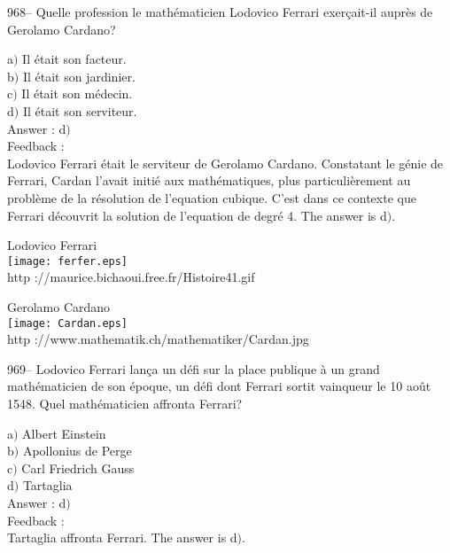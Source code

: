 ﻿\documentclass[letterpaper, 12pt]{article}
\begin{document}
968-- Quelle profession le math\'ematicien Lodovico Ferrari exer\c
cait-il aupr\`es de Gerolamo Cardano?

a$)$ Il \'etait son facteur. \\
b$)$ Il \'etait son jardinier.  \\
c$)$ Il \'etait son m\'edecin. \\
d$)$ Il \'etait son serviteur. \\

Answer : d$)$\\

Feedback : \\
Lodovico Ferrari \'etait le serviteur de Gerolamo Cardano.
Constatant le g\'enie de Ferrari, Cardan l'avait initi\'e aux
math\'emati\-ques, plus particuli\`erement au probl\`eme de la
r\'esolution de l'equation
cubique. C'est dans ce contexte que Ferrari d\'ecouvrit la solution de
l'equation de degr\'e 4. The answer is d$)$.\\

        \begin{center}
        Lodovico Ferrari\\
    \texttt{[image: ferfer.eps]}\\
        {\footnotesize http ://maurice.bichaoui.free.fr/Histoire41.gif}
    \end{center}

        \begin{center}
        Gerolamo Cardano\\
    \texttt{[image: Cardan.eps]}\\
        {\footnotesize http ://www.mathematik.ch/mathematiker/Cardan.jpg}
    \end{center}

969-- Lodovico Ferrari lan\c ca un d\'efi sur la place publique \`a
un grand math\'ematicien de son \'epoque, un d\'efi dont Ferrari
sortit vainqueur le 10 ao\^ut 1548. Quel math\'ematicien affronta
Ferrari?

a$)$ Albert Einstein \\
b$)$ Apollonius de Perge  \\
c$)$ Carl Friedrich Gauss \\
d$)$ Tartaglia\\

Answer : d$)$\\

Feedback :\\
Tartaglia affronta Ferrari. The answer is d$)$.\\
\end{document}
